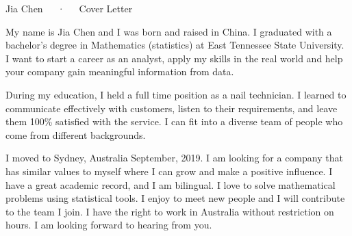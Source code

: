 \documentclass[11pt, a4paper]{awesome-cv}
\begin{document}
\makecvheader[R]

\makecvfooter
  {}
  {Jia Chen~~~·~~~Cover Letter}
  {}

\makelettertitlename

\begin{cvletter}


My name is Jia Chen and I was born and raised in China. I graduated with a bachelor’s degree in Mathematics (statistics) at East Tennessee State University. I want to start a career as an analyst, apply my skills in the real world and help your company gain meaningful information from data. 

During my education, I held a full time position as a nail technician. I learned to communicate effectively with customers, listen to their requirements, and leave them 100\% satisfied with the service. I can fit into a diverse team of people who come from different backgrounds. 

I moved to Sydney, Australia September, 2019. I am looking for a company that has similar values to myself where I can grow and make a positive influence. I have a great academic record, and I am bilingual. I love to solve mathematical problems using statistical tools. I enjoy to meet new people and I will contribute to the team I join. I have the right to work in Australia without restriction on hours. I am looking forward to hearing from you.
\end{cvletter}


\makeletterclosing
\end{document}
